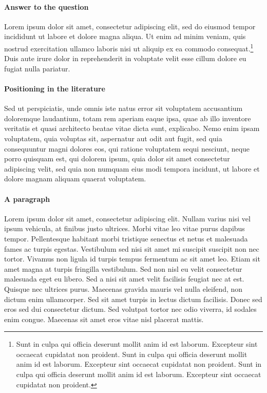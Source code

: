 \documentclass[letterpaper,11pt,leqno]{article}
\begin{document}
\paragraph{Answer to the question} Lorem ipsum dolor sit amet, consectetur adipiscing elit, sed do eiusmod tempor incididunt ut labore et dolore magna aliqua. Ut enim ad minim veniam, quis nostrud exercitation ullamco laboris nisi ut aliquip ex ea commodo consequat.\footnote{Sunt in culpa qui officia deserunt mollit anim id est laborum. Excepteur sint occaecat cupidatat non proident. Sunt in culpa qui officia deserunt mollit anim id est laborum. Excepteur sint occaecat cupidatat non proident. Sunt in culpa qui officia deserunt mollit anim id est laborum. Excepteur sint occaecat cupidatat non proident.} Duis aute irure dolor in reprehenderit in voluptate velit esse cillum dolore eu fugiat nulla pariatur. 

\paragraph{Positioning in the literature} Sed ut perspiciatis, unde omnis iste natus error sit voluptatem accusantium doloremque laudantium, totam rem aperiam eaque ipsa, quae ab illo inventore veritatis et quasi architecto beatae vitae dicta sunt, explicabo. Nemo enim ipsam voluptatem, quia voluptas sit, aspernatur aut odit aut fugit, sed quia consequuntur magni dolores eos, qui ratione voluptatem sequi nesciunt, neque porro quisquam est, qui dolorem ipsum, quia dolor sit amet consectetur adipiscing velit, sed quia non numquam eius modi tempora incidunt, ut labore et dolore magnam aliquam quaerat voluptatem.

\paragraph{A paragraph} Lorem ipsum dolor sit amet, consectetur adipiscing elit. Nullam varius nisi vel ipsum vehicula, at finibus justo ultrices. Morbi vitae leo vitae purus dapibus tempor. Pellentesque habitant morbi tristique senectus et netus et malesuada fames ac turpis egestas. Vestibulum sed nisi sit amet mi suscipit suscipit non nec tortor. Vivamus non ligula id turpis tempus fermentum ac sit amet leo. Etiam sit amet magna at turpis fringilla vestibulum. Sed non nisl eu velit consectetur malesuada eget eu libero. Sed a nisi sit amet velit facilisis feugiat nec at est. Quisque nec ultrices purus. Maecenas gravida mauris vel nulla eleifend, non dictum enim ullamcorper. Sed sit amet turpis in lectus dictum facilisis. Donec sed eros sed dui consectetur dictum. Sed volutpat tortor nec odio viverra, id sodales enim congue. Maecenas sit amet eros vitae nisl placerat mattis.
\end{document}
